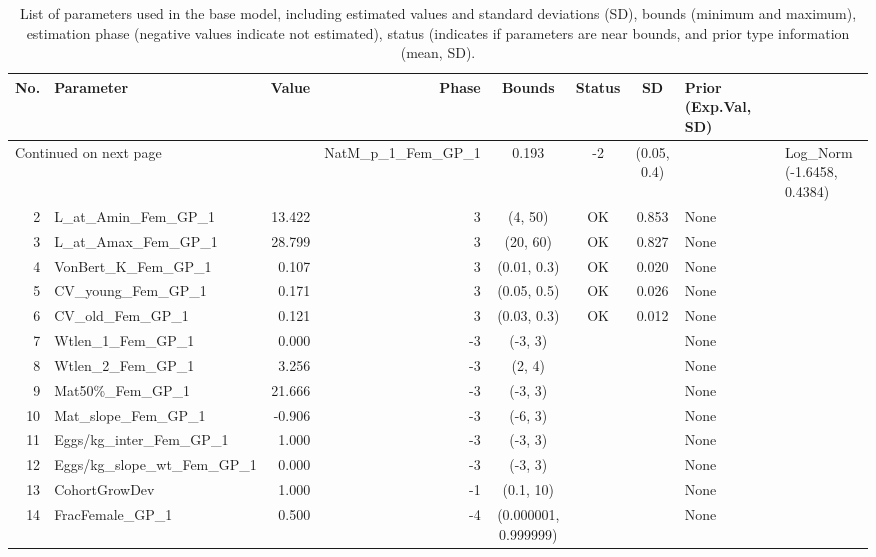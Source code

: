\documentclass[12pt,]{article}
\begin{document}
\begin{landscape}

\begin{longtable}{rlrrcccp{1.5in}}
\caption{List of parameters used in
                                              the base model, including estimated 
                                              values and standard deviations (SD), 
                                              bounds (minimum and maximum), 
                                              estimation phase (negative values indicate
                                              not estimated), status (indicates if 
                                              parameters are near bounds, and prior type
                                              information (mean, SD).} \\ 
  \hline
No. & Parameter & Value & Phase & Bounds & Status & SD & Prior (Exp.Val, SD)  \\ 
  \hline 
\endhead 
\hline 
\multicolumn{3}{l}{\footnotesize Continued on next page} 
\endfoot 
\endlastfoot 
 \hline
1 & NatM\_p\_1\_Fem\_GP\_1 & 0.193 & -2 & (0.05, 0.4) &  &  & Log\_Norm (-1.6458, 0.4384) \\ 
  2 & L\_at\_Amin\_Fem\_GP\_1 & 13.422 & 3 & (4, 50) & OK & 0.853 & None \\ 
  3 & L\_at\_Amax\_Fem\_GP\_1 & 28.799 & 3 & (20, 60) & OK & 0.827 & None \\ 
  4 & VonBert\_K\_Fem\_GP\_1 & 0.107 & 3 & (0.01, 0.3) & OK & 0.020 & None \\ 
  5 & CV\_young\_Fem\_GP\_1 & 0.171 & 3 & (0.05, 0.5) & OK & 0.026 & None \\ 
  6 & CV\_old\_Fem\_GP\_1 & 0.121 & 3 & (0.03, 0.3) & OK & 0.012 & None \\ 
  7 & Wtlen\_1\_Fem\_GP\_1 & 0.000 & -3 & (-3, 3) &  &  & None \\ 
  8 & Wtlen\_2\_Fem\_GP\_1 & 3.256 & -3 & (2, 4) &  &  & None \\ 
  9 & Mat50\%\_Fem\_GP\_1 & 21.666 & -3 & (-3, 3) &  &  & None \\ 
  10 & Mat\_slope\_Fem\_GP\_1 & -0.906 & -3 & (-6, 3) &  &  & None \\ 
  11 & Eggs/kg\_inter\_Fem\_GP\_1 & 1.000 & -3 & (-3, 3) &  &  & None \\ 
  12 & Eggs/kg\_slope\_wt\_Fem\_GP\_1 & 0.000 & -3 & (-3, 3) &  &  & None \\ 
  13 & CohortGrowDev & 1.000 & -1 & (0.1, 10) &  &  & None \\ 
  14 & FracFemale\_GP\_1 & 0.500 & -4 & (0.000001, 0.999999) &  &  & None \\ 

\end{longtable}
\end{landscape}
\end{document}

